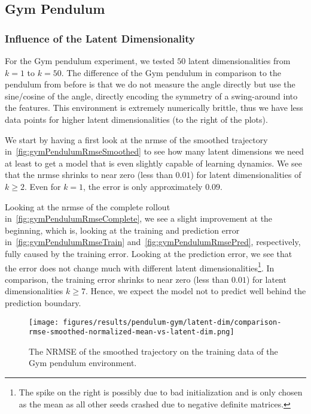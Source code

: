 	\subsection{Gym Pendulum} %
		\subsubsection{Influence of the Latent Dimensionality}
			\label{subsubsec:gymPendulumLatents}

			For the Gym pendulum experiment, we tested \(50\) latent dimensionalities from \( k = 1 \) to \( k = 50 \). The difference of the Gym pendulum in comparison to the pendulum from before is that we do not measure the angle directly but use the sine/cosine of the angle, directly encoding the symmetry of a swing-around into the features. This environment is extremely numerically brittle, thus we have less data points for higher latent dimensionalities (to the right of the plots).

			We start by having a first look at the \ac{nrmse} of the smoothed trajectory in~\autoref{fig:gymPendulumRmseSmoothed} to see how many latent dimensions we need at least to get a model that is even slightly capable of learning dynamics. We see that the \ac{nrmse} shrinks to near zero (less than \( 0.01 \)) for latent dimensionalities of \( k \geq 2 \). Even for \( k = 1 \), the error is only approximately \( 0.09 \).

			Looking at the \ac{nrmse} of the complete rollout in~\autoref{fig:gymPendulumRmseComplete}, we see a slight improvement at the beginning, which is, looking at the training and prediction error in~\autoref{fig:gymPendulumRmseTrain} and~\autoref{fig:gymPendulumRmsePred}, respectively, fully caused by the training error. Looking at the prediction error, we see that the error does not change much with different latent dimensionalities\footnote{The spike on the right is possibly due to bad initialization and is only chosen as the mean as all other seeds crashed due to negative definite matrices.}. In comparison, the training error shrinks to near zero (less than \( 0.01 \)) for latent dimensionalities \( k \geq 7 \). Hence, we expect the model not to predict well behind the prediction boundary.

			\begin{figure}
				\centering
				\texttt{[image: figures/results/pendulum-gym/latent-dim/comparison-rmse-smoothed-normalized-mean-vs-latent-dim.png]}
				\caption[Error of the smoothed trajectory on the training data of the Gym pendulum experiment]{The NRMSE of the smoothed trajectory on the training data of the Gym pendulum environment.}
				\label{fig:gymPendulumRmseSmoothed}
			\end{figure}

